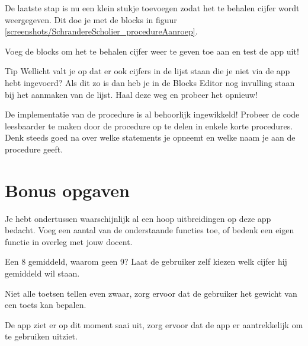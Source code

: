 De laatste stap is nu een klein stukje toevoegen zodat het te behalen cijfer wordt weergegeven. Dit doe je met de blocks in figuur \ref{screenshots/SchrandereScholier_procedureAanroep}. \runOpTelefoon{} 

\begin{opgave}
    \opgVraag
Voeg de blocks om het te behalen cijfer weer te geven toe aan  en test de app uit!
\end{opgave}

\begin{derivation}{Tip}
Wellicht valt je op dat er ook cijfers in de lijst staan die je niet via de app hebt ingevoerd? Als dit zo is dan heb je in de Blocks Editor nog invulling staan bij het aanmaken van de lijst. Haal deze weg en probeer het opnieuw!
\end{derivation}

\begin{opgave}
    \opgVraag
De implementatie van de procedure  is al behoorlijk ingewikkeld! Probeer de code leesbaarder te maken door de procedure op te delen in enkele korte procedures. Denk steeds goed na over welke statements je opneemt en welke naam je aan de procedure geeft.
\end{opgave}

\section{Bonus opgaven}
Je hebt ondertussen waarschijnlijk al een hoop uitbreidingen op deze app bedacht. Voeg een aantal van de onderstaande functies toe, of bedenk een eigen functie in overleg met jouw docent.

\begin{opgave}
    \opgVraag
    Een 8 gemiddeld, waarom geen 9? Laat de gebruiker zelf kiezen welk cijfer hij gemiddeld wil staan.
\end{opgave}

\begin{opgave}
    \opgVraag
    Niet alle toetsen tellen even zwaar, zorg ervoor dat de gebruiker het gewicht van een toets kan bepalen.
\end{opgave}

\begin{opgave}
    \opgVraag
    De app ziet er op dit moment saai uit, zorg ervoor dat de app er aantrekkelijk om te gebruiken uitziet.
\end{opgave}

